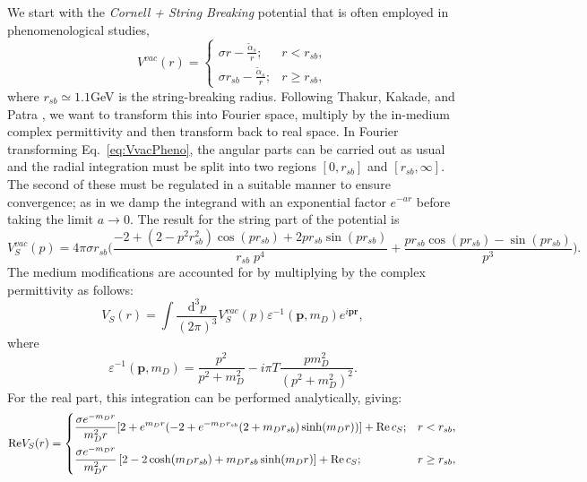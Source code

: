 \documentclass[12pt,a4paper]{article}
\newcommand{\brac}[1] {\!\left(#1\right)}
\newcommand{\rsb}{r_{sb}}
\begin{document}
We start with the \emph{Cornell + String Breaking} potential that is often employed in phenomenological studies,
\begin{equation}
\label{eq:VvacPheno}
V^{vac}\brac{r}=\begin{cases}
    \sigma r -\frac{\tilde{\alpha}_s}{r}; & r<r_{sb},\\
    \sigma r_{sb}-\frac{\tilde{\alpha}_s}{r}; &r\geq r_{sb},
  \end{cases}
\end{equation}
where \(r_{sb}\simeq 1.1\)GeV is the string-breaking radius. Following Thakur, Kakade, and Patra \cite{Thakur:2013nia}, we want to transform this into Fourier space, multiply by the in-medium complex permittivity and then transform back to real space. In Fourier transforming Eq.~\eqref{eq:VvacPheno}, the angular parts can be carried out as usual and the radial integration must be split into two regions \(\left[0,r_{sb}\right]\) and \(\left[r_{sb},\infty\right]\). The second of these must be regulated in a suitable manner to ensure convergence; as in \cite{Thakur:2013nia} we damp the integrand with an exponential factor \(e^{-ar}\) before taking the limit \(a\to 0\). The result for the string part of the potential is
\begin{equation}
\label{eq:VvacPhenoFourier}
V^{vac}_{S}\brac{p}=4\pi\sigma\rsb\Bigg(\frac{-2+\brac{2-p^2r_{sb}^2}\cos\brac{p r_{sb}}+2 p r_{sb}\sin\brac{p r_{sb}}}{\rsb\;p^4}+\frac{p r_{sb}\cos\brac{p r_{sb}}-\sin\brac{p r_{sb}}}{p^3}\Bigg).
\end{equation}
The medium modifications are accounted for by multiplying by the complex permittivity as follows:
\begin{equation}
\label{eq:VMedMod}
V_{S}\brac{r}=\int\frac{\mathrm{d}^3p}{\brac{2\pi}^3}V^{vac}_{S}\brac{p}\varepsilon^{-1}\brac{\mathbf{p},m_D}e^{i\mathbf{pr}},
\end{equation}
where
\begin{equation}
\label{eq:MedPerm}
\varepsilon^{-1}\!\left(\mathbf{p},m_{D}\right)=\frac{p^2}{p^2+m_D^2}-i\pi T \frac{p m_D^2}{\left(p^2+m_D^2\right)^2}.
\end{equation}
For the real part, this integration can be performed analytically, giving:
\begin{equation}
\label{eq:ReVs}
\mathrm{Re}V_{S}\brac{r}=\begin{dcases}
	\frac{\sigma e^{-m_D r}}{m_D^2r}[2+e^{m_D r}(-2+e^{-m_D\rsb}\brac{2+m_D\rsb}\sinh\brac{m_Dr})]+\mathrm{Re}\,c_S; & r<r_{sb},\\
    \frac{\sigma e^{-m_D r}}{{m_D^2r}}\left[2-2\cosh\brac{m_D\rsb}+m_D\rsb\sinh\brac{m_Dr}\right]+\mathrm{Re}\,c_S; &r\geq r_{sb},
  \end{dcases}
\end{equation}
\end{document}

